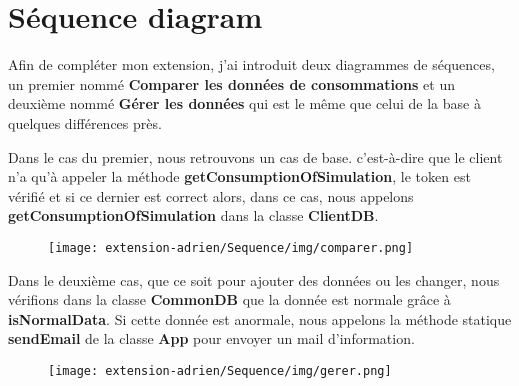 \section{Séquence diagram}

\begin{flushleft}
Afin de compléter mon extension, j'ai introduit deux diagrammes de séquences, un premier nommé \textbf{Comparer les données de consommations} et un deuxième nommé \textbf{Gérer les données} qui est le même que celui de la base à quelques différences près.
\end{flushleft}

\begin{flushleft}
Dans le cas du premier, nous retrouvons un cas de base. c'est-à-dire que le client n'a qu'à appeler la méthode \textbf{getConsumptionOfSimulation}, le token est vérifié et si ce dernier est correct alors, dans ce cas, nous appelons \textbf{getConsumptionOfSimulation} dans la classe \textbf{ClientDB}.
\end{flushleft}

\begin{figure}[h]
\centering
\texttt{[image: extension-adrien/Sequence/img/comparer.png]}
\end{figure}

\begin{flushleft}
Dans le deuxième cas, que ce soit pour ajouter des données ou les changer, nous vérifions dans la classe \textbf{CommonDB} que la donnée est normale grâce à \textbf{isNormalData}. Si cette donnée est anormale, nous appelons la méthode statique \textbf{sendEmail} de la classe \textbf{App} pour envoyer un mail d'information.
\end{flushleft}

\begin{figure}[h]
\centering
\texttt{[image: extension-adrien/Sequence/img/gerer.png]}
\end{figure}
